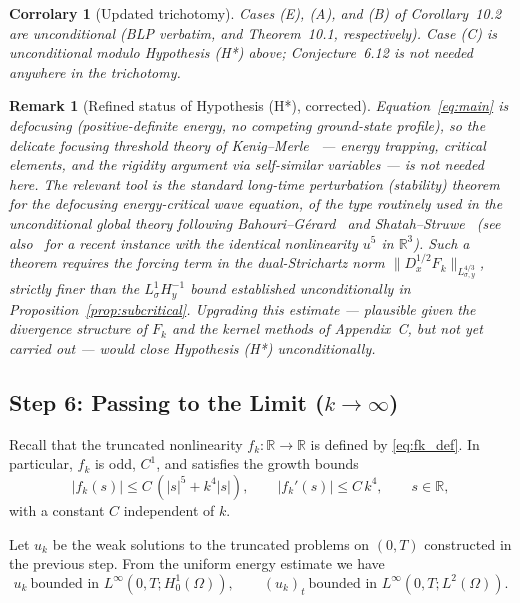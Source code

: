 \documentclass[11pt,letterpaper]{amsart}
\newtheorem{remark}[theorem]{Remark}
\newtheorem{corollary}[theorem]{Corrolary}
\begin{document}
\begin{corollary}[Updated trichotomy]
Cases (E), (A), and (B) of Corollary~10.2 are unconditional (BLP verbatim, and Theorem~10.1,
respectively). Case (C) is unconditional \emph{modulo Hypothesis (H*)} above; Conjecture~6.12
is not needed anywhere in the trichotomy.
\end{corollary}

\begin{remark}[Refined status of Hypothesis (H*), corrected]
Equation~\eqref{eq:main} is defocusing (positive-definite energy, no competing
ground-state profile), so the delicate focusing threshold theory of
Kenig--Merle~\cite{KenigMerle} — energy trapping, critical elements, and the
rigidity argument via self-similar variables — is not needed here. The relevant
tool is the standard long-time perturbation (stability) theorem for the
\emph{defocusing} energy-critical wave equation, of the type routinely used in the
unconditional global theory following Bahouri--Gérard~\cite{BahouriGerard} and
Shatah--Struwe~\cite{ShatahStruwe} (see also~\cite{DodsonLooi2026} for a recent
instance with the identical nonlinearity $u^5$ in $\mathbb R^3$). Such a theorem
requires the forcing term in the dual-Strichartz norm
$\|D_x^{1/2}F_k\|_{L^{4/3}_{\sigma,y}}$, strictly finer than the $L^1_\sigma H^{-1}_y$
bound established unconditionally in Proposition~\ref{prop:subcritical}. Upgrading
this estimate — plausible given the divergence structure of $F_k$ and the kernel
methods of Appendix~C, but not yet carried out — would close Hypothesis (H*)
unconditionally.
\end{remark}



\subsection{Step 6: Passing to the Limit ($k \to \infty$)}


Recall that the truncated nonlinearity $f_k:\mathbb R\to\mathbb R$ is defined by
\eqref{eq:fk_def}. In particular, $f_k$ is odd, $C^1$, and satisfies the growth bounds
\begin{equation}\label{eq:fk-growth}
|f_k(s)| \le C\,(|s|^5 + k^4|s|),\qquad
|f_k'(s)| \le C\,k^4,\qquad s\in\mathbb R,
\end{equation}
with a constant $C$ independent of $k$.

Let $u_k$ be the weak solutions to the truncated problems on $(0,T)$
constructed in the previous step. From the uniform energy estimate we have
\begin{equation}\label{eq:uk-energy-bounds}
u_k \ \text{bounded in } L^\infty(0,T;H_0^1(\Omega)),\qquad
(u_k)_t \ \text{bounded in } L^\infty(0,T;L^2(\Omega)).
\end{equation}
\end{document}
